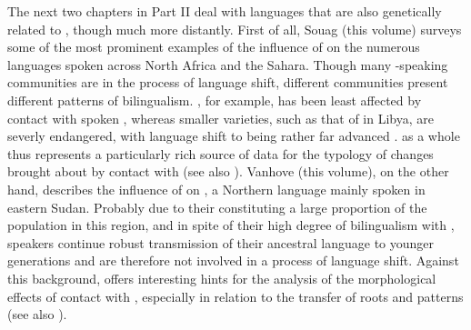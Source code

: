 \documentclass[output=paper]{langsci/langscibook}
\begin{document}
The next two chapters in Part II deal with languages that are also genetically related to , though much more distantly. First of all, Souag (this volume) surveys some of the most prominent examples of the influence of  on the numerous  languages spoken across North Africa and the Sahara. Though many -speaking communities are in the process of {language shift}, different communities present different patterns of {bilingualism}. , for example, has been least affected by contact with spoken , whereas smaller varieties, such as that of  in Libya, are severly {endangered}, with {language shift} to  being rather far advanced \citep{vanPuttenSouag2015}.  as a whole thus represents a particularly rich source of data for the typology of changes brought about by contact with  (see also \citealt{Kossmann2013book}). Vanhove (this volume), on the other hand, describes the influence of  on , a {Northern}  language mainly spoken in eastern Sudan. Probably due to their constituting a large proportion of the population in this region, and in spite of their high degree of {bilingualism} with  ,  speakers continue robust {transmission} of their ancestral language to younger generations and are therefore not involved in a process of {language shift}. Against this background,  offers interesting hints for the analysis of the morphological effects of contact with , especially in relation to the {transfer} of {roots} and patterns (see also \citealt{Vanhove2012}).
\end{document}
